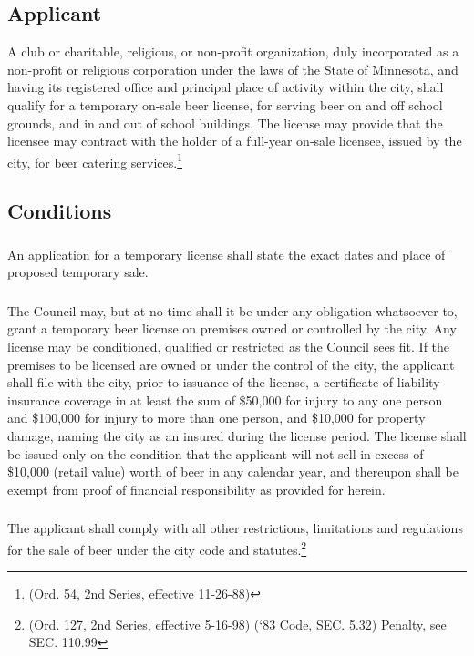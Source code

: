 \subsection{Applicant}
A club or charitable, religious, or non-profit organization, duly incorporated as a non-profit or religious corporation under the laws of the State of Minnesota, and having its registered office and principal place of activity within the city, shall qualify for a temporary on-sale beer license, for serving beer on and off school grounds, and in and out of school buildings.  The license may provide that the licensee may contract with the holder of a full-year on-sale licensee, issued by the city, for beer catering services.\footnote{(Ord. 54, 2nd Series, effective 11-26-88)}
\subsection{Conditions}
\subsubsection{}
An application for a temporary license shall state the exact dates and place of proposed temporary sale.
\subsubsection{}
The Council may, but at no time shall it be under any obligation whatsoever to, grant a temporary beer license on premises owned or controlled by the city.  Any license may be conditioned, qualified or restricted as the Council sees fit.  If the premises to be licensed are owned or under the control of the city, the applicant shall file with the city, prior to issuance of the license, a certificate of liability insurance coverage in at least the sum of \$50,000 for injury to any one person and \$100,000 for injury to more than one person, and \$10,000 for property damage, naming the city as an insured during the license period.  The license shall be issued only on the condition that the applicant will not sell in excess of \$10,000 (retail value) worth of beer in any calendar year, and thereupon shall be exempt from proof of financial responsibility as provided for herein.
\subsubsection{}
The applicant shall comply with all other restrictions, limitations and regulations for the sale of beer under the city code and statutes.\footnote{(Ord. 127, 2nd Series, effective 5-16-98) (‘83 Code, SEC. 5.32)  Penalty, see SEC. 110.99}

